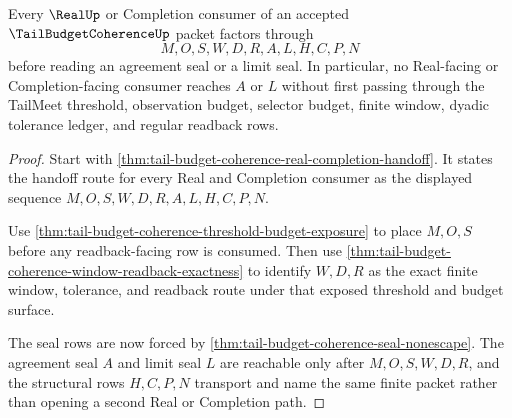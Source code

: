 \begin{theorem}
\label{thm:tail-budget-coherence-real-route-scope}
Every $\RealUp$ or Completion consumer of an accepted $\TailBudgetCoherenceUp$ packet factors through
$$
M,O,S,W,D,R,A,L,H,C,P,N
$$
before reading an agreement seal or a limit seal. In particular, no Real-facing or Completion-facing consumer reaches $A$ or $L$ without first passing through the TailMeet threshold, observation budget, selector budget, finite window, dyadic tolerance ledger, and regular readback rows.
\end{theorem}
\begin{proof}
Start with \autoref{thm:tail-budget-coherence-real-completion-handoff}. It states the handoff route for every Real and Completion consumer as the displayed sequence $M,O,S,W,D,R,A,L,H,C,P,N$.

Use \autoref{thm:tail-budget-coherence-threshold-budget-exposure} to place $M,O,S$ before any readback-facing row is consumed. Then use \autoref{thm:tail-budget-coherence-window-readback-exactness} to identify $W,D,R$ as the exact finite window, tolerance, and readback route under that exposed threshold and budget surface.

The seal rows are now forced by \autoref{thm:tail-budget-coherence-seal-nonescape}. The agreement seal $A$ and limit seal $L$ are reachable only after $M,O,S,W,D,R$, and the structural rows $H,C,P,N$ transport and name the same finite packet rather than opening a second Real or Completion path.
\end{proof}

